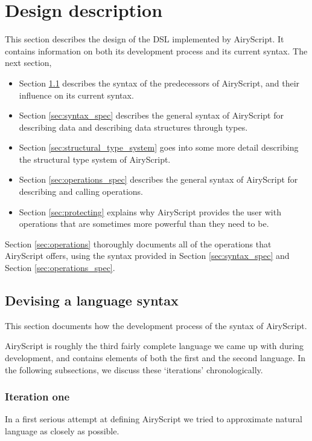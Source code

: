 \section{Design description}
This section describes the design of the DSL implemented by AiryScript. It
contains information on both its development process and its current syntax. The
next section,
\begin{itemize}
  \item Section \ref{sec:devising_syntax} describes the syntax of the
    predecessors of AiryScript, and their influence on its current syntax.
%
  \item Section \ref{sec:syntax_spec} describes the general syntax of AiryScript
    for describing data and describing data structures through types.
%
  \item Section \ref{sec:structural_type_system} goes into some more detail
    describing the structural type system of AiryScript.
%
  \item Section \ref{sec:operations_spec} describes the general syntax of
    AiryScript for describing and calling operations.
%
  \item Section \ref{sec:protecting} explains why AiryScript provides the user
    with operations that are sometimes more powerful than they need to be.
\end{itemize}

\noindent
Section \ref{sec:operations} thoroughly documents all of the operations that
AiryScript offers, using the syntax provided in Section \ref{sec:syntax_spec}
and Section \ref{sec:operations_spec}.

\subsection{Devising a language syntax}
\label{sec:devising_syntax}
This section documents how the development process of the syntax of AiryScript.

AiryScript is roughly the third fairly complete language we came up with during
development, and contains elements of both the first and the second language. In
the following subsections, we discuss these ‘iterations’ chronologically.

\subsubsection{Iteration one}
In a first serious attempt at defining AiryScript we tried to approximate
natural language as closely as possible.

